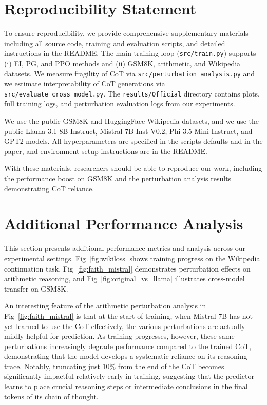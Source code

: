 \documentclass{article}
\theoremstyle{plain}
\theoremstyle{definition}
\theoremstyle{remark}
\begin{document}
\section{Reproducibility Statement}
To ensure reproducibility, we provide comprehensive supplementary materials including all source code, training and evaluation scripts, and detailed instructions in the README. The main training loop (\texttt{src/train.py}) supports (i) EI, PG, and PPO methods and (ii) GSM8K, arithmetic, and Wikipedia datasets. We measure fragility of CoT via \texttt{src/perturbation\_analysis.py} and we estimate interpretability of CoT generations via \texttt{src/evaluate\_cross\_model.py}. The \texttt{results/Official} directory contains plots, full training logs, and perturbation evaluation logs from our experiments. 

We use the public GSM8K and HuggingFace Wikipedia datasets, and we use the public Llama 3.1 8B Instruct, Mistral 7B Inst V0.2, Phi 3.5 Mini-Instruct, and GPT2 models. All hyperparameters are specified in the scripts defaults and in the paper, and environment setup instructions are in the README. 

With these materials, researchers should be able to reproduce our work, including the performance boost on GSM8K and the perturbation analysis results demonstrating CoT reliance.





\newpage
\appendix
\onecolumn
\section{Additional Performance Analysis}
This section presents additional performance metrics and analysis across our experimental settings. Fig~\ref{fig:wikiloss} shows training progress on the Wikipedia continuation task, Fig~\ref{fig:faith_mistral} demonstrates perturbation effects on arithmetic reasoning, and Fig~\ref{fig:original_vs_llama} illustrates cross-model transfer on GSM8K.

An interesting feature of the arithmetic perturbation analysis in Fig~\ref{fig:faith_mistral} is that at the start of training, when Mistral 7B has not yet learned to use the CoT effectively, the various perturbations are actually mildly helpful for prediction. As training progresses, however, these same perturbations increasingly degrade performance compared to the trained CoT, demonstrating that the model develops a systematic reliance on its reasoning trace. Notably, truncating just 10\% from the end of the CoT becomes significantly impactful relatively early in training, suggesting that the predictor learns to place crucial reasoning steps or intermediate conclusions in the final tokens of its chain of thought.
\end{document}
